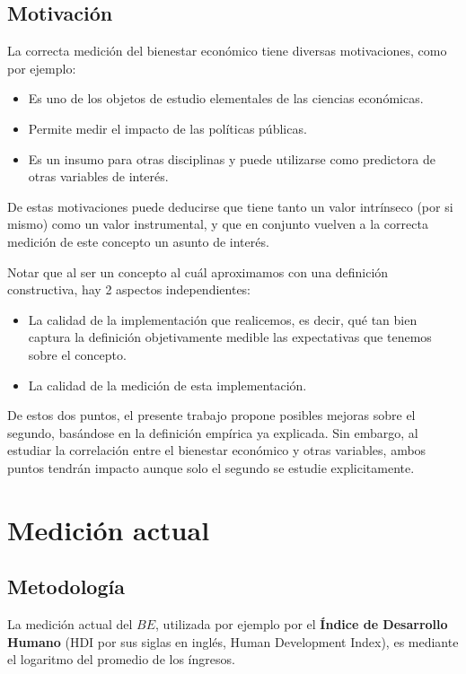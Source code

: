 \subsection{Motivación}

La correcta medición del bienestar económico tiene diversas motivaciones, como por ejemplo:

\begin{itemize}
    \item Es uno de los objetos de estudio elementales de las ciencias económicas.
    \item Permite medir el impacto de las políticas públicas.
    \item Es un insumo para otras disciplinas y puede utilizarse como predictora de otras variables de interés.
\end{itemize}

De estas motivaciones puede deducirse que tiene tanto un valor intrínseco (por si mismo) como un valor instrumental, y que en conjunto vuelven a la correcta medición de este concepto un asunto de interés.

Notar que al ser un concepto al cuál aproximamos con una definición constructiva, hay 2 aspectos independientes:

\begin{itemize}
    \item La calidad de la implementación que realicemos, es decir, qué tan bien captura la definición objetivamente medible las expectativas que tenemos sobre el concepto.
    \item La calidad de la medición de esta implementación.
\end{itemize}

De estos dos puntos, el presente trabajo propone posibles mejoras sobre el segundo, basándose en la definición empírica ya explicada. Sin embargo, al estudiar la correlación entre el bienestar económico y otras variables, ambos puntos tendrán impacto aunque solo el segundo se estudie explicitamente.

\section{Medición actual}

\subsection{Metodología}

La medición actual del $BE$, utilizada por ejemplo por el \textbf{Índice de Desarrollo Humano} \cite{undp2023tech_notes} (HDI por sus siglas en inglés, Human Development Index), es mediante el logaritmo del promedio de los íngresos.

